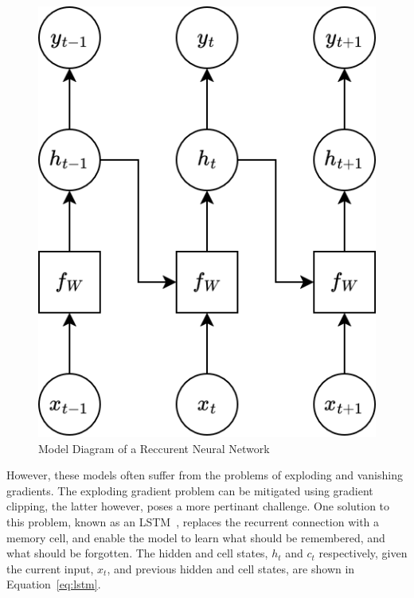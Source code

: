 \documentclass[twocolumn]{article}
\begin{document}
\begin{figure}[h]
    \centering
    \includegraphics[scale=0.25]{assets/rnn.png}
    \caption{Model Diagram of a Reccurent Neural Network}
    \label{fig:rnn}
\end{figure}

However, these models often suffer from the problems of exploding and vanishing gradients. The exploding gradient problem can be mitigated using gradient clipping, the latter however, poses a more pertinant challenge. One solution to this problem, known as an LSTM~\cite{hochreiter1997long}, replaces the recurrent connection with a memory cell, and enable the model to learn what should be remembered, and what should be forgotten. The hidden and cell states, $h_t$ and $c_t$ respectively, given the current input, $x_t$, and previous hidden and cell states, are shown in Equation~\ref{eq:lstm}. 
\end{document}
